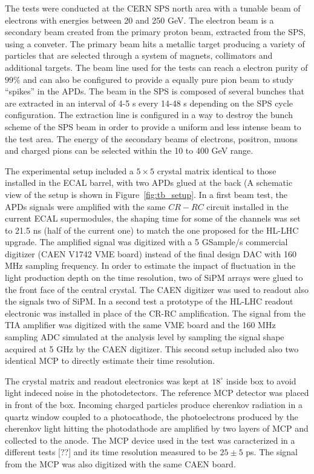 The tests were conducted at the CERN SPS north area with a tunable beam of electrons with energies between 20 and 250 GeV.
The electron beam is a secondary beam created from the primary proton beam, extracted from the SPS, using a conveter.
The primary beam hits a metallic target producing a variety of particles that are selected through a system of magnets, collimators
and additional targets. The beam line used for the tests can reach a electron purity of $99\%$ and can also be
configured to provide a equally pure pion beam to study ``spikes'' in the APDs.
The beam in the SPS is composed of several bunches that are extracted in an interval of 4-5 s every 14-48 s depending on the
SPS cycle configuration. The extraction line is configured in a way to destroy the bunch scheme of the SPS beam in order
to provide a uniform and less intense beam to the test area.
The energy of the secondary beams of electrons, positron, muons and charged pions can be selected within the 10 to 400 GeV
range. 

The experimental setup included a $5\times 5$ \PbWO crystal matrix identical to those installed in the ECAL barrel,
with two APDs glued at the back (A schematic view of the setup is shown in Figure~\ref{fig:tb_setup}.
In a first beam test, the APDs signals were amplified with the same $CR-RC$ circuit installed in the current ECAL
supermodules, the shaping time for some of the channels was set to 21.5 ns (half of the current one) to match the
one proposed for the HL-LHC upgrade.
The amplified signal was digitized with a 5 GSample/s commercial digitizer (CAEN V1742 VME board)
instead of the final design DAC with 160 MHz sampling frequency.
In order to estimate the impact of fluctuation in the light production depth on the time resolution,
two of SiPM arrays were glued to the front face of the central crystal.
The CAEN digitizer was used to readout also the signals two of SiPM.
In a second test a prototype of the HL-LHC readout electronic was installed in place of the
CR-RC amplification. The signal from the TIA amplifier was digitized with the same VME board and the
160 MHz sampling ADC simulated at the analysis level by sampling the signal shape acquired at 5 GHz by the CAEN digitizer.
This second setup included also two identical MCP to directly estimate their time resolution.

The crystal matrix and readout electronics was kept at $18^{\circ}$ inside box to avoid
light indeced noise in the photodetectors. The reference MCP detector was placed in front of the box. 
Incoming charged particles produce cherenkov radiation in a quartz window coupled to a photocathode,
the photoelectrons produced by the cherenkov light hitting
the photodathode are amplified by two layers of MCP and collected to the anode. 
The MCP device used in the test was caracterized 
in a different tests [??] and its time resolution measured to be $25\pm5$ ps.
The signal from the MCP was also digitized with the same CAEN board.

